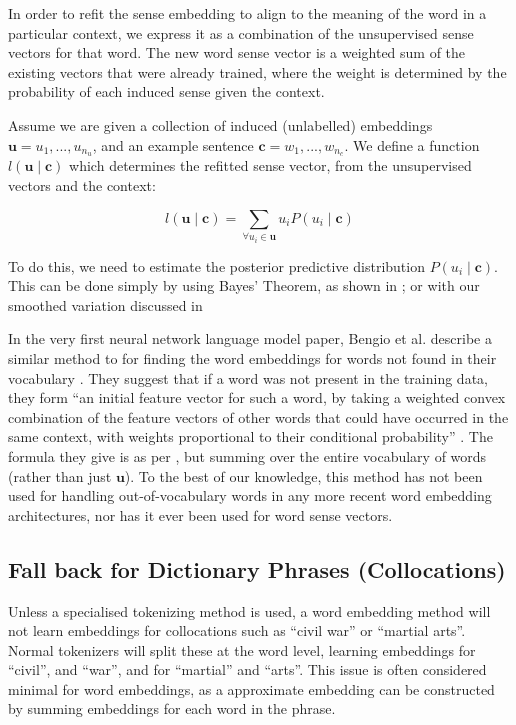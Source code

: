 \documentclass{sig-alternate}
\renewcommand{\c}{\mathbf{c}}
\renewcommand{\u}{\mathbf{u}}
\begin{document}
In order to refit the sense embedding to align to the meaning of the word in a particular context, we express it as a combination of the unsupervised sense vectors for that word.
The new word sense vector is a weighted sum of the existing vectors that were already trained, where the weight is determined by the probability of each induced sense given the context.


Assume we are given a collection of induced (unlabelled) embeddings $\u={u_1,...,u_{n_u}}$, and an example sentence $\c={w_1,...,w_{n_c}}$. We define a function $l(\u \mid \c )$ which determines the refitted sense vector, from the unsupervised vectors and the context:

\begin{equation} \label{eq:synth}
l(\u \mid \c ) = \sum_{\forall u_i \in \u} u_i P(u_i \mid \c)
\end{equation}

To do this, we need to estimate the posterior predictive distribution $P(u_i \mid \c)$.
This can be done simply by using Bayes' Theorem, as shown in ; or with our smoothed variation discussed in 


In the very first neural network language model paper, Bengio et al. describe a similar method to  for finding the word embeddings for words not found in their vocabulary \parencite{NPLM}. They suggest that if a word was not present in the training data, they form \enquote{an initial feature vector for such a word, by taking a weighted convex combination of the feature vectors of other words that could have occurred in the same context, with weights proportional to their conditional probability} \parencite{NPLM}. The formula they give is as per , but summing over the entire vocabulary of words (rather than just $\u$). To the best of our knowledge, this method has not been used for handling out-of-vocabulary words in any more recent word embedding architectures, nor has it ever been used for word sense vectors.


\subsection {Fall back for Dictionary Phrases (Collocations)}
Unless a specialised tokenizing method is used, a word embedding method will not learn embeddings for collocations such as ``civil war'' or ``martial arts''. Normal tokenizers will split these at the word level, learning embeddings for ``civil'', and ``war'', and for ``martial'' and ``arts''. This issue is often considered minimal for word embeddings, as a approximate embedding can be constructed by summing embeddings for each word in the phrase.
\end{document}
